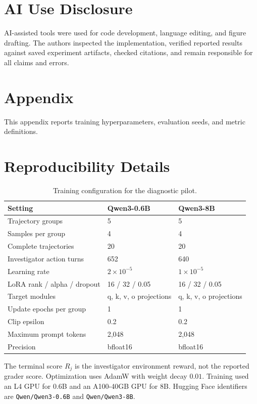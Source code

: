 \documentclass{article}
\begin{document}
\section*{AI Use Disclosure}

AI-assisted tools were used for code development, language editing, and figure drafting. The authors inspected the implementation, verified reported results against saved experiment artifacts, checked citations, and remain responsible for all claims and errors.




\appendix
\section*{Appendix}
This appendix reports training hyperparameters, evaluation seeds, and metric definitions.

\section{Reproducibility Details}

\begin{table}[h]
\centering
\caption{Training configuration for the diagnostic pilot.}
\small
\begin{tabular}{lll}
\toprule
Setting & Qwen3-0.6B & Qwen3-8B \\
\midrule
Trajectory groups & 5 & 5 \\
Samples per group & 4 & 4 \\
Complete trajectories & 20 & 20 \\
Investigator action turns & 652 & 640 \\
Learning rate & $2\times10^{-5}$ & $1\times10^{-5}$ \\
LoRA rank / alpha / dropout & 16 / 32 / 0.05 & 16 / 32 / 0.05 \\
Target modules & q, k, v, o projections & q, k, v, o projections \\
Update epochs per group & 1 & 1 \\
Clip epsilon & 0.2 & 0.2 \\
Maximum prompt tokens & 2,048 & 2,048 \\
Precision & bfloat16 & bfloat16 \\
\bottomrule
\end{tabular}
\end{table}

The terminal score $R_j$ is the investigator environment reward, not the reported grader score. Optimization uses AdamW with weight decay $0.01$. Training used an L4 GPU for 0.6B and an A100-40GB GPU for 8B. Hugging Face identifiers are \texttt{Qwen/Qwen3-0.6B} and \texttt{Qwen/Qwen3-8B}.
\end{document}
